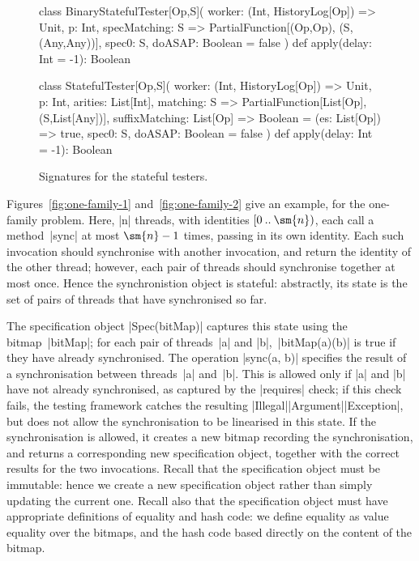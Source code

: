 \begin{figure}
\begin{scala}
class BinaryStatefulTester[Op,S](
  worker: (Int, HistoryLog[Op]) => Unit,
  p: Int,
  specMatching: S => PartialFunction[(Op,Op), (S,(Any,Any))],
  spec0: S,
  doASAP: Boolean = false
){
  def apply(delay: Int = -1): Boolean
}

class StatefulTester[Op,S](
  worker: (Int, HistoryLog[Op]) => Unit,
  p: Int, 
  arities: List[Int],
  matching: S => PartialFunction[List[Op], (S,List[Any])],
  suffixMatching: List[Op] => Boolean = (es: List[Op]) => true,
  spec0: S, 
  doASAP: Boolean = false
){
  def apply(delay: Int = -1): Boolean
}
\end{scala}
\caption{Signatures for the stateful testers.\label{fig:stateful-testers}}
\end{figure}

%



Figures~\ref{fig:one-family-1} and~\ref{fig:one-family-2} give an example, for
the one-family problem.  Here, |n| threads, with identities $\upto0{\sm{n}}$,
each call a method~|sync| at most $\sm{n}-1$ times, passing in its own
identity.  Each such invocation should synchronise with another invocation,
and return the identity of the other thread; however, each pair of threads
should synchronise together at most once.  Hence the synchronistion object is
stateful: abstractly, its state is the set of pairs of threads that have
synchronised so far.

The specification object |Spec(bitMap)| captures this state using the
bitmap~|bitMap|; for each pair of threads~|a| and |b|,\, |bitMap(a)(b)| is
true if they have already synchronised.  The operation |sync(a, b)| specifies
the result of a synchronisation between threads~|a| and~|b|.  This is allowed
only if |a| and |b| have not already synchronised, as captured by the
|requires| check; if this check fails, the testing framework catches the
resulting |Illegal|\-|Argument|\-|Exception|, but does not allow the
synchronisation to be linearised in this state.  If the synchronisation is
allowed, it creates a new bitmap recording the synchronisation, and returns a
corresponding new specification object, together with the correct results for
the two invocations.  Recall that the specification object must be immutable:
hence we create a new specification object rather than simply updating the
current one.  Recall also that the specification object must have appropriate
definitions of equality and hash code: we define equality as value equality
over the bitmaps, and the hash code based directly on the content of the
bitmap.

